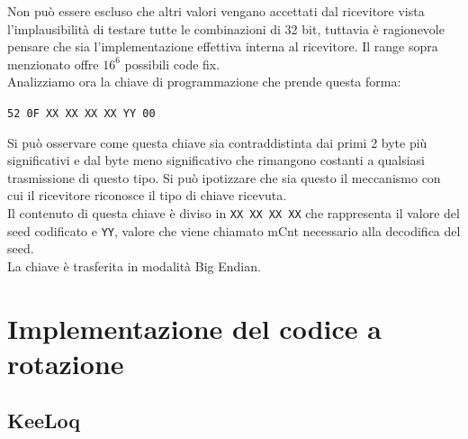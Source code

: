 Non può essere escluso che altri valori vengano accettati dal ricevitore vista l’implausibilità di testare tutte le combinazioni di 32 bit, tuttavia è ragionevole pensare che sia l’implementazione effettiva interna al ricevitore. Il range sopra menzionato offre $16^{6}$ possibili code fix.\\
Analizziamo ora la chiave di programmazione che prende questa forma:
\begin{center}
  \texttt{52 0F XX XX XX XX YY 00}
\end{center}
Si può osservare come questa chiave sia contraddistinta dai primi 2 byte più significativi e dal byte meno significativo che rimangono costanti a qualsiasi trasmissione di questo tipo. Si può ipotizzare che sia questo il meccanismo con cui il ricevitore riconosce il tipo di chiave ricevuta.\\
Il contenuto di questa chiave è diviso in \texttt{XX XX XX XX} che rappresenta il valore del seed codificato e \texttt{YY}, valore che viene chiamato mCnt necessario alla decodifica del seed.\\
La chiave è trasferita in modalità Big Endian.

\section{Implementazione del codice a rotazione}
\label{sec:rolling}

\subsection{KeeLoq}
\label{sub:keeloq}

